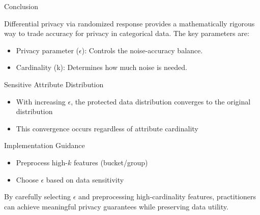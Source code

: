 \documentclass{beamer}
\begin{document}
\begin{frame}{Conclusion}

Differential privacy via randomized response provides a mathematically rigorous way to trade accuracy for privacy in categorical data. The key parameters are:
\begin{itemize}
\item Privacy parameter ($\epsilon$): Controls the noise-accuracy balance.
\item Cardinality (k): Determines how much noise is needed.
\end{itemize}

\begin{alertblock}{Sensitive Attribute Distribution}
\begin{itemize}
\item With increasing $\epsilon$, the protected data distribution converges to the original distribution
\item This convergence occurs regardless of attribute cardinality
\end{itemize}
\end{alertblock}

\begin{alertblock}{Implementation Guidance}
\begin{itemize}
\item Preprocess high-$k$ features (bucket/group)
\item Choose $\epsilon$ based on data sensitivity
\end{itemize}
\end{alertblock}

By carefully selecting $\epsilon$ and preprocessing high-cardinality features, practitioners can achieve meaningful privacy guarantees while preserving data utility.

\end{frame}

\begin{frame}

\end{frame}
\end{document}
